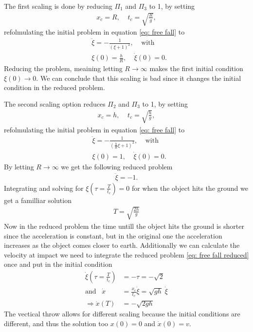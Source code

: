 \documentclass[a4paper]{article}
\begin{document}
The first scaling is done by reducing $\Pi_1$ and $\Pi_3$ to 1, by setting
\begin{align}
        x_c = R, \;\;\;\; t_c = \sqrt{\frac{R}{g}},
\end{align}
refolmulating the initial problem in equation \ref{eq: free fall} to
\begin{align}
    &\ddot{\xi} = -\frac{1}{(\xi + 1)^2},\;\;\;\;
    \text{with} \nonumber\\
    &\xi(0) = \frac{h}{R}, \;\;\;\; \dot{\xi}(0) = 0.
\end{align}
Reducing the problem, meaining letting $R \rightarrow \infty$ makes the first
initial condition $\xi(0) \rightarrow 0$. We can conclude that this scaling
is bad since it changes the initial condition in the reduced problem.

The second scaling option reduces $\Pi_2$ and $\Pi_3$ to 1, by setting
\begin{align}
        x_c = h, \;\;\;\; t_c = \sqrt{\frac{h}{g}},
\end{align}
refolmulating the initial problem in equation \ref{eq: free fall} to
\begin{align}
    &\ddot{\xi} = -\frac{1}{(\frac{h}{R}\xi + 1)^2},\;\;\;\;
    \text{with} \nonumber\\
    &\xi(0) = 1, \;\;\;\; \dot{\xi}(0) = 0.
\end{align}
By letting $R \rightarrow \infty$ we get the following reduced problem
\begin{align}\label{eq: free fall reduced}
    \ddot{\xi} = -1.
\end{align}
Integrating and solving for $\xi(\tau = \frac{T}{t_c}) = 0$ for when the
object hits the ground we get a familliar solution
\begin{align}
    T = \sqrt{\frac{2h}{g}}
\end{align}
Now in the reduced problem the time untill the object hits the ground is
shorter since the acceleration is constant, but in the original one the
acceleration increases as the object comes closer to earth.
Additionally we can calculate the velocity at impact we need to integrate the
reduced problem \ref{eq: free fall reduced} once and put in the initial
condition
\begin{align}
    \dot{\xi}(\tau = \frac{T}{t_c}) &= -\tau = -\sqrt{2} \\
    \text{and} \;\;\; \dot{x} &= \frac{x_c}{t_c}\dot{\xi} =
    \sqrt{gh}\; \dot{\xi}\\
    \Rightarrow \dot{x}(T) &= -\sqrt{2gh}
\end{align}
The vectical throw allows for different scaling because the initial
conditions are different, and thus the solution too $x(0) = 0$ and
$\dot{x}(0) = v$.
\end{document}
